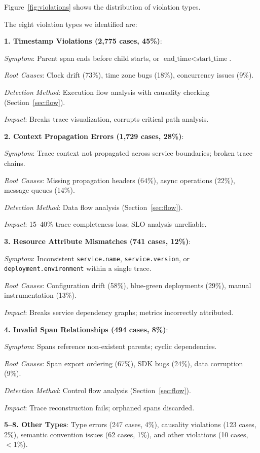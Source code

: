 Figure~\ref{fig:violations} shows the distribution of violation types. %

The eight violation types we identified are:

\textbf{1. Timestamp Violations (2,775 cases, 45\%)}:

\textit{Symptom}: Parent span ends before child starts, or $\text{end\_time} < \text{start\_time}$.

\textit{Root Causes}: Clock drift (73\%), time zone bugs (18\%), concurrency issues (9\%).

\textit{Detection Method}: Execution flow analysis with causality checking (Section~\ref{sec:flow}).

\textit{Impact}: Breaks trace visualization, corrupts critical path analysis.

\textbf{2. Context Propagation Errors (1,729 cases, 28\%)}:

\textit{Symptom}: Trace context not propagated across service boundaries; broken trace chains.

\textit{Root Causes}: Missing propagation headers (64\%), async operations (22\%), message queues (14\%).

\textit{Detection Method}: Data flow analysis (Section~\ref{sec:flow}).

\textit{Impact}: 15--40\% trace completeness loss; SLO analysis unreliable.

\textbf{3. Resource Attribute Mismatches (741 cases, 12\%)}:

\textit{Symptom}: Inconsistent \texttt{service.name}, \texttt{service.version}, or \texttt{deployment.environment} within a single trace.

\textit{Root Causes}: Configuration drift (58\%), blue-green deployments (29\%), manual instrumentation (13\%).

\textit{Impact}: Breaks service dependency graphs; metrics incorrectly attributed.

\textbf{4. Invalid Span Relationships (494 cases, 8\%)}:

\textit{Symptom}: Spans reference non-existent parents; cyclic dependencies.

\textit{Root Causes}: Span export ordering (67\%), SDK bugs (24\%), data corruption (9\%).

\textit{Detection Method}: Control flow analysis (Section~\ref{sec:flow}).

\textit{Impact}: Trace reconstruction fails; orphaned spans discarded.

\textbf{5--8. Other Types}: Type errors (247 cases, 4\%), causality violations (123 cases, 2\%), semantic convention issues (62 cases, 1\%), and other violations (10 cases, $<$1\%).


